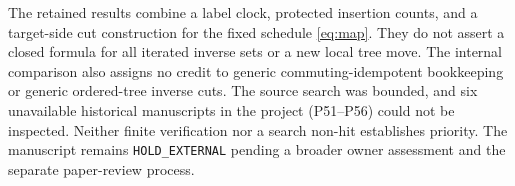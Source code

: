 \documentclass[a4paper,10pt]{amsart}
\theoremstyle{remark}
\begin{document}
The retained results combine a label clock, protected insertion counts,
and a target-side cut construction for the fixed schedule \eqref{eq:map}.
They do not assert a closed formula for all iterated inverse sets or a
new local tree move. The internal comparison also assigns no credit to
generic commuting-idempotent bookkeeping or generic ordered-tree inverse
cuts. The source search was bounded, and six unavailable historical
manuscripts in the project (P51--P56) could not be inspected.
Neither finite verification nor a search non-hit establishes priority.
The manuscript remains \texttt{HOLD\_EXTERNAL} pending a broader owner
assessment and the separate paper-review process.



\end{document}
